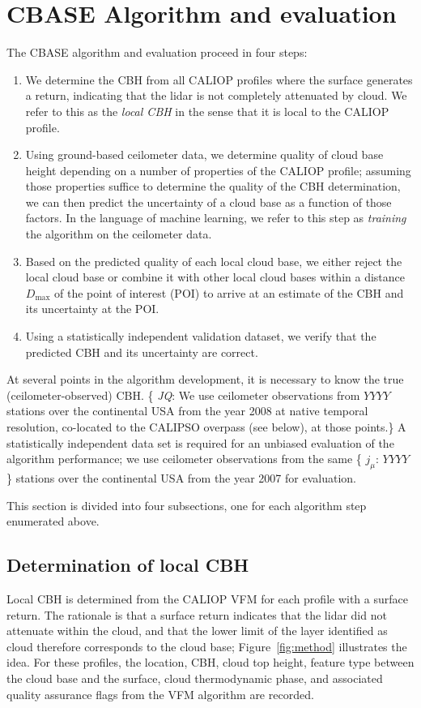 \documentclass[essd,manuscript]{copernicus}\usepackage[]{graphicx}\usepackage[]{color}
\newcommand{\hlnum}[1]{\textcolor[rgb]{0.686,0.059,0.569}{#1}}%
\newcommand\comment[2]{\{\hlnum{ \textit{#1}: #2}\}}
\newcommand\commentjm[1]{\comment{$j_\mu$}{#1}}
\begin{document}
\section{CBASE Algorithm and evaluation}
\label{sec:algorithm}

The CBASE algorithm and evaluation proceed in four steps:
\begin{enumerate}
\item We determine the CBH from all CALIOP profiles where the
  surface generates a return, indicating that the lidar is not completely
  attenuated by cloud.  We refer to this as the \textit{local
    CBH} in the sense that it is local to the CALIOP profile.
\item Using ground-based ceilometer data, we determine quality of cloud base
  height depending on a number of properties of the CALIOP profile; assuming
  those properties suffice to determine the quality of the CBH determination, we
  can then predict the uncertainty of a cloud base as a function of those
  factors.  In the language of machine learning, we refer to this step as
  \textit{training} the algorithm on the ceilometer data.
\item Based on the predicted quality of each local cloud base, we either reject
  the local cloud base or combine it with other local cloud bases within a
  distance $D_\text{max}$ of the point of interest (POI) to arrive at an 
  estimate of the CBH and its uncertainty at the POI.
\item Using a statistically independent validation dataset, we verify that the
  predicted CBH and its uncertainty are correct.
\end{enumerate}

At several points in the algorithm development, it is necessary to know the true
(ceilometer-observed) CBH.  \comment{JQ}{We use ceilometer observations from
$YYYY$ stations over the continental USA from the year 2008 at
native temporal resolution, co-located to the CALIPSO overpass (see below), at
those points.}  A statistically independent data set is required for an unbiased
evaluation of the algorithm performance; we use ceilometer observations from the
same \commentjm{$YYYY$} stations over the continental USA from the year 2007 for
evaluation.

This section is divided into four subsections, one for each algorithm step
enumerated above.

\subsection{Determination of local CBH}
\label{sec:algorithm:local}
Local CBH is determined from the CALIOP VFM for each profile with a surface
return.  The rationale is that a surface return indicates that the lidar did not
attenuate within the cloud, and that the lower limit of the layer identified as
cloud therefore corresponds to the cloud base; Figure~\ref{fig:method}
illustrates the idea.  For these profiles, the location, CBH, cloud top height,
feature type between the cloud base and the surface,
cloud thermodynamic phase, and associated quality assurance flags from the VFM
algorithm are recorded.
\end{document}
